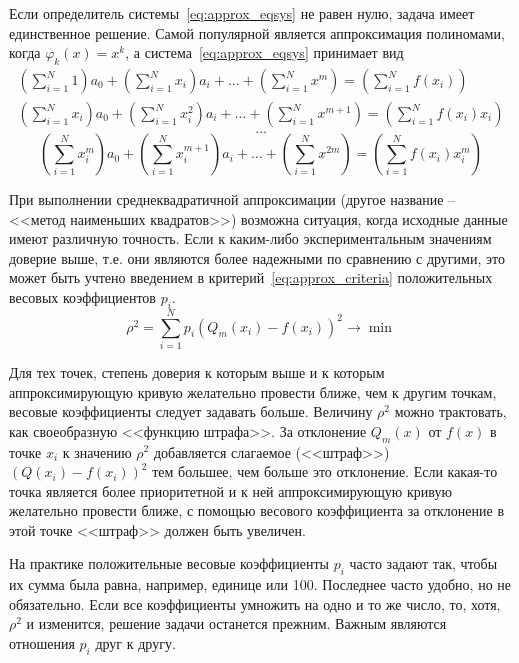 \documentclass[../../calc-math-exam-2023.tex]{subfiles}
\begin{document}
    Если определитель системы~\eqref{eq:approx_eqsys} не равен нулю, задача
    имеет единственное решение. Самой популярной является аппроксимация полиномами, когда
    $\varphi_k(x) = x^k$, а система~\eqref{eq:approx_eqsys} принимает вид
    \begin{gather*}
        \left( \sum_{i=1}^{N} 1 \right)a_0 + \left( \sum_{i=1}^{N} x_i \right)a_i + \dots + \left( \sum_{i=1}^{N} x^m \right) = \left( \sum_{i=1}^{N} f(x_i) \right)\\
        \left( \sum_{i=1}^{N} x_i \right)a_0 + \left( \sum_{i=1}^{N} x_i^2 \right)a_i + \dots + \left( \sum_{i=1}^{N} x^{m+1} \right) = \left( \sum_{i=1}^{N} f(x_i)x_i \right)
    \end{gather*}
    \begin{equation}
        \dots
    \end{equation}
    \begin{equation*}
        \left( \sum_{i=1}^{N} x_i^m \right)a_0 + \left( \sum_{i=1}^{N} x_i^{m+1} \right)a_i + \dots + \left( \sum_{i=1}^{N} x^{2m} \right) = \left( \sum_{i=1}^{N} f(x_i)x_i^m \right)
    \end{equation*}

    При выполнении среднеквадратичной аппроксимации (другое название -- <<метод наименьших квадратов>>)
    возможна ситуация, когда исходные данные имеют различную точность. Если к каким-либо экспериментальным
    значениям доверие выше, т.е. они являются более надежными по сравнению с другими, это может быть
    учтено введением в критерий~\eqref{eq:approx_criteria} положительных весовых коэффициентов $p_i$.
    \begin{equation}
        \rho^2 = \sum_{i=1}^{N} p_i \left( Q_m(x_i) - f(x_i) \right)^2 \rightarrow \min \label{eq:approx_with_p}
    \end{equation}

    Для тех точек, степень доверия к которым выше и к которым аппроксимирующую кривую желательно
    провести ближе, чем к другим точкам, весовые коэффициенты следует задавать больше. Величину
    $\rho^2$ можно трактовать, как своеобразную <<функцию штрафа>>. За отклонение $Q_m(x)$ от
    $f(x)$ в точке $x_i$ к значению $\rho^2$ добавляется слагаемое (<<штраф>>) $\left( Q(x_i) - f(x_i) \right)^2$
    тем большее, чем больше это отклонение. Если какая-то точка является более приоритетной
    и к ней аппроксимирующую кривую желательно провести ближе, с помощью весового коэффициента
    за отклонение в этой точке <<штраф>> должен быть увеличен.

    На практике положительные весовые коэффициенты $p_i$ часто задают так, чтобы их сумма была
    равна, например, единице или 100. Последнее часто удобно, но не обязательно. Если все коэффициенты
    умножить на одно и то же число, то, хотя, $\rho^2$ и изменится, решение задачи останется прежним.
    Важным являются отношения $p_i$ друг к другу.
\end{document}

